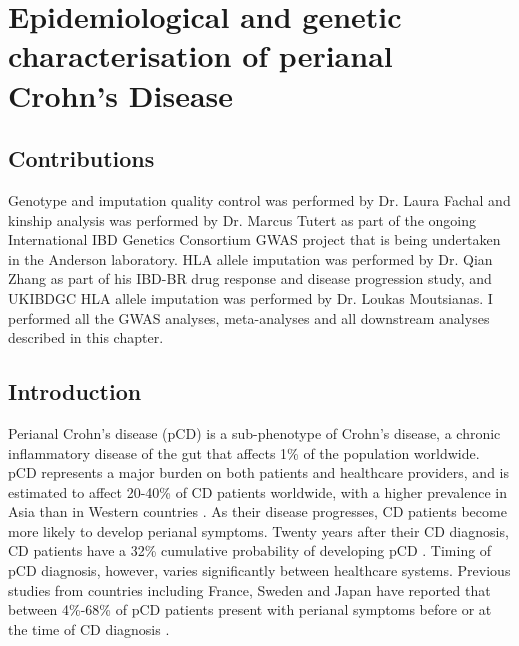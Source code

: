 
\chapter{Epidemiological and genetic characterisation of perianal Crohn's Disease}

\ifpdf
    \graphicspath{{Chapter4/Figs/Raster/}{Chapter4/Figs/PDF/}{Chapter4/Figs/}}
\else
    \graphicspath{{Chapter4/Figs/Vector/}{Chapter4/Figs/}}
\fi
\section{Contributions}
Genotype and imputation quality control was performed by Dr. Laura Fachal and kinship analysis was performed by Dr. Marcus Tutert as part of the ongoing International IBD Genetics Consortium GWAS project that is being undertaken in the Anderson laboratory. HLA allele imputation was performed by Dr. Qian Zhang as part of his IBD-BR drug response and disease progression study, and UKIBDGC HLA allele imputation was performed by Dr. Loukas Moutsianas. I performed all the GWAS analyses, meta-analyses and all downstream analyses described in this chapter.
\section{Introduction}
Perianal Crohn's disease (pCD) is a sub-phenotype of Crohn's disease, a chronic inflammatory disease of the gut that affects 1\% of the population worldwide. pCD represents a major burden on both patients and healthcare providers, and is estimated to affect 20-40\% of CD patients worldwide, with a higher prevalence in Asia than in Western countries \cite{Ng2016-al}. As their disease progresses, CD patients become more likely to develop perianal symptoms. Twenty years after their CD diagnosis, CD patients have a 32\% cumulative probability of developing pCD \cite{Brochard2022-hx}. Timing of pCD diagnosis, however, varies significantly between healthcare systems. Previous studies from countries including France, Sweden and Japan have reported that between 4\%-68\% of pCD patients present with perianal symptoms before or at the time of CD diagnosis \cite{Mizushima2021-hk,Pogacnik2019-aj,Wils2021-ao}.\\

